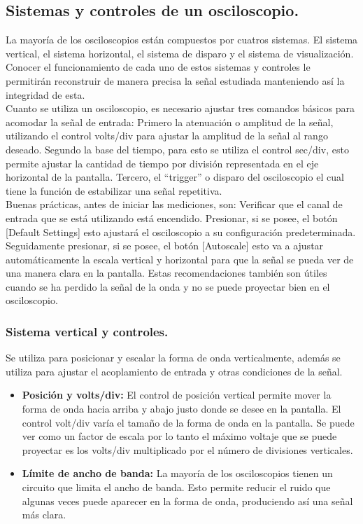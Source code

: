 \documentclass[12pt,letterpaper]{report}
\begin{document}
\subsection{Sistemas y controles de un osciloscopio.} La mayoría de los osciloscopios están compuestos por cuatros sistemas. El sistema vertical, el sistema horizontal, el sistema de disparo y el sistema de visualización. Conocer el funcionamiento de cada uno de estos sistemas y controles le permitirán reconstruir de manera precisa la señal estudiada manteniendo así la integridad de esta.\\
Cuanto se utiliza un osciloscopio, es necesario ajustar tres comandos básicos para acomodar la señal de entrada: Primero la atenuación o amplitud de la señal, utilizando el control volts/div para ajustar la amplitud de la señal al rango deseado. Segundo la base del tiempo, para esto se utiliza el control sec/div, esto permite ajustar la cantidad de tiempo por división representada en el eje horizontal de la pantalla. Tercero, el “trigger” o disparo del osciloscopio el cual tiene la función de estabilizar una señal repetitiva.\\
Buenas prácticas, antes de iniciar las mediciones, son: Verificar que el canal de entrada que se está utilizando está encendido. Presionar, si se posee, el botón [Default Settings] esto ajustará el osciloscopio a su configuración predeterminada. Seguidamente presionar, si se posee, el botón [Autoscale] esto va a ajustar automáticamente la escala vertical y horizontal para que la señal se pueda ver de una manera clara en la pantalla. Estas recomendaciones también son útiles cuando se ha perdido la señal de la onda y no se puede proyectar bien en el osciloscopio.

\subsubsection{Sistema vertical y controles.} Se utiliza para posicionar y escalar la forma de onda verticalmente, además se utiliza para ajustar el acoplamiento de entrada y otras condiciones de la señal.
\begin{itemize}
\item \textbf{Posición y volts/div: } El control de posición vertical permite mover la forma de onda hacia arriba y abajo justo donde se desee en la pantalla. El control volt/div varía el tamaño de la forma de onda en la pantalla. Se puede ver como un factor de escala por lo tanto el máximo voltaje que se puede proyectar es los volts/div multiplicado por el número de divisiones verticales.
\item \textbf{Límite de ancho de banda:} La mayoría de los osciloscopios tienen un circuito que limita el ancho de banda. Esto permite reducir el ruido que algunas veces puede aparecer en la forma de onda, produciendo así una señal más clara.
\end{itemize}
\end{document}
